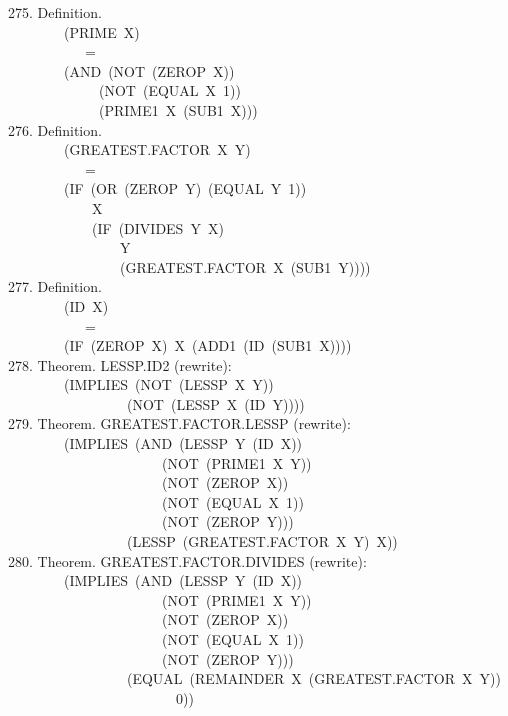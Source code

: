 \documentclass[10pt]{book}
\newenvironment{pubasis}{\begin{flushleft}}{\end{flushleft}}
\begin{document}
\begin{pubasis}
275.    Definition.\\
~~~~~~~~(PRIME~X)\\
~~~~~~~~~~~=\\
~~~~~~~~(AND~(NOT~(ZEROP~X))\\
~~~~~~~~~~~~~(NOT~(EQUAL~X~1))\\
~~~~~~~~~~~~~(PRIME1~X~(SUB1~X)))\\

276.    Definition.\\
~~~~~~~~(GREATEST.FACTOR~X~Y)\\
~~~~~~~~~~~=\\
~~~~~~~~(IF~(OR~(ZEROP~Y)~(EQUAL~Y~1))\\
~~~~~~~~~~~~X\\
~~~~~~~~~~~~(IF~(DIVIDES~Y~X)\\
~~~~~~~~~~~~~~~~Y\\
~~~~~~~~~~~~~~~~(GREATEST.FACTOR~X~(SUB1~Y))))\\

277.    Definition.\\
~~~~~~~~(ID~X)\\
~~~~~~~~~~~=\\
~~~~~~~~(IF~(ZEROP~X)~X~(ADD1~(ID~(SUB1~X))))\\

278.    Theorem.  LESSP.ID2 (rewrite):\\
~~~~~~~~(IMPLIES~(NOT~(LESSP~X~Y))\\
~~~~~~~~~~~~~~~~~(NOT~(LESSP~X~(ID~Y))))\\

279.    Theorem.  GREATEST.FACTOR.LESSP (rewrite):\\
~~~~~~~~(IMPLIES~(AND~(LESSP~Y~(ID~X))\\
~~~~~~~~~~~~~~~~~~~~~~(NOT~(PRIME1~X~Y))\\
~~~~~~~~~~~~~~~~~~~~~~(NOT~(ZEROP~X))\\
~~~~~~~~~~~~~~~~~~~~~~(NOT~(EQUAL~X~1))\\
~~~~~~~~~~~~~~~~~~~~~~(NOT~(ZEROP~Y)))\\
~~~~~~~~~~~~~~~~~(LESSP~(GREATEST.FACTOR~X~Y)~X))\\

280.    Theorem.  GREATEST.FACTOR.DIVIDES (rewrite):\\
~~~~~~~~(IMPLIES~(AND~(LESSP~Y~(ID~X))\\
~~~~~~~~~~~~~~~~~~~~~~(NOT~(PRIME1~X~Y))\\
~~~~~~~~~~~~~~~~~~~~~~(NOT~(ZEROP~X))\\
~~~~~~~~~~~~~~~~~~~~~~(NOT~(EQUAL~X~1))\\
~~~~~~~~~~~~~~~~~~~~~~(NOT~(ZEROP~Y)))\\
~~~~~~~~~~~~~~~~~(EQUAL~(REMAINDER~X~(GREATEST.FACTOR~X~Y))\\
~~~~~~~~~~~~~~~~~~~~~~~~0))\\


\end{pubasis}
\end{document}
